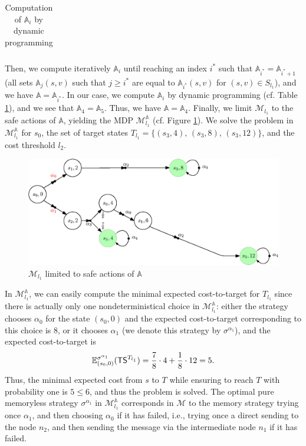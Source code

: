 \begin{example}
\begin{table}[h]
\begin{tabular}{l|cccccc}
\end{tabular}
  \caption{Computation of $\mathbb{A}_i$ by dynamic programming}
  \label{my-table2}
\end{table}
Then, we compute iteratively $\mathbb{A}_i$ until reaching an index $i^*$ such that $\mathbb{A}_{i^*} = \mathbb{A}_{i^*+1}$ (all sets $\mathbb{A}_{j}(s, v)$ such that $j \geq i^*$ are equal to $\mathbb{A}_{i^*}(s, v)$ for $(s, v)\in S_{l_1}$), and we have $\mathbb{A} = \mathbb{A}_{i^*}$.
In our case, we compute $\mathbb{A}_i$ by dynamic programming (cf. Table \ref{my-table2}), and we see that $\mathbb{A}_4=\mathbb{A}_5$. Thus, we have $\mathbb{A} = \mathbb{A}_4$.
Finally, we limit $\mathcal{M}_{l_1}$ to the safe actions of $\mathbb{A}$, yielding the MDP $\mathcal{M}_{l_1}^\mathbb{A}$ (cf. Figure \ref{safe_actions}).
We solve the \SSPE{} problem in $\mathcal{M}_{l_1}^\mathbb{A}$ for $s_0$, the set of target states $T_{l_1} = \{(s_3, 4), \, (s_3, 8), \, (s_3, 12)\}$, and the cost threshold $l_2$.
\begin{figure}[h]
  \centering
  \includegraphics[width=0.8\linewidth]{resources/main-example-unfoldingA}
  \caption{$\mathcal{M}_{l_1}$ limited to safe actions of $\mathbb{A}$}
  \label{safe_actions}
\end{figure}
In $\mathcal{M}_{l_1}^\mathbb{A}$, we can easily compute the minimal expected cost-to-target for $T_{l_1}$ since there is actually only one nondeterministical choice in $\mathcal{M}_{l_1}^\mathbb{A}$: either the strategy chooses $\alpha_0$ for the state $(s_0, 0)$ and the expected cost-to-target corresponding to this choice is $8$, or it chooses $\alpha_1$ (we denote this strategy by $\sigma^{\alpha_1}$), and the expected cost-to-target is
\[
  \mathbb{E}^{\sigma^{\alpha_1}}_{(s_0, 0)}(\text{\sffamily TS}^{T_{l_1}}) = \frac{7}{8} \cdot 4 + \frac{1}{8} \cdot 12 = 5.
\]
Thus, the minimal expected cost from $s$ to $T$ while ensuring to reach $T$ with probability one is $5 \leq 6$, and thus the \SSPWE{} problem is solved. The optimal pure memoryless strategy $\sigma^{\alpha_1}$ in $\mathcal{M}_{l_1}^\mathbb{A}$ corresponds
in $\mathcal{M}$ to the memory strategy trying once $\alpha_1$, and then choosing $\alpha_0$ if it has failed, i.e., trying once a direct sending to the node $n_2$, and then sending the message via the intermediate node $n_1$ if it has failed.
\end{example}

